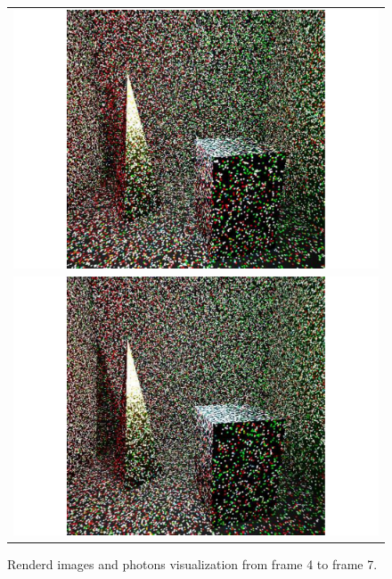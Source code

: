 \begin{figure}
\begin{center}
{\begin{tabular}{c}
\includegraphics*[scale=0.25]{imgs/pqv_frame6.pdf}\\
\includegraphics*[scale=0.25]{imgs/pqv_frame7.pdf}
\end{tabular}
}%
\caption{Renderd images and photons visualization from frame 4 to frame 7.}
\end{center}
\label{fig:result_images2}
\end{figure}

